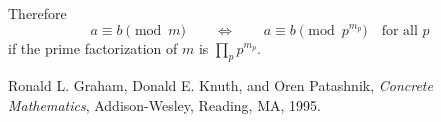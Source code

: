 \documentclass{article}
\begin{document}
Therefore
\begin{equation*}
a\equiv b\pmod{m}
\qquad\Longleftrightarrow\qquad
a\equiv b \pmod{p^{m_p}}\quad\text{for all $p$}  
\end{equation*}
if the prime factorization of $m$ is $\prod_p p^{m_p}$.

\begin{thebibliography}{9}
Ronald L. Graham, Donald E. Knuth, and Oren Patashnik,
\textit{Concrete Mathematics},
Addison-Wesley, Reading, MA, 1995.
\end{thebibliography}
\end{document}
